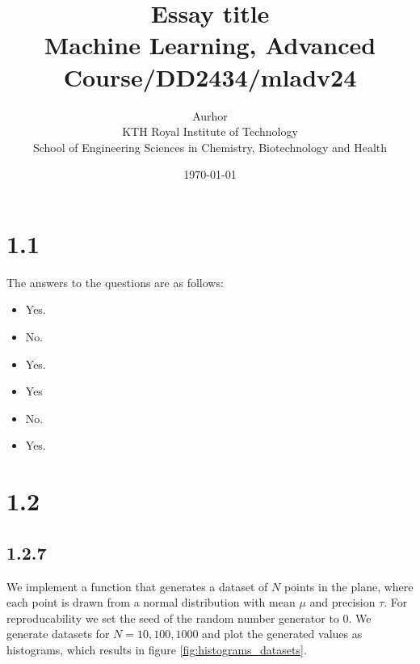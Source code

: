 \documentclass{article}
\title{Essay title\\\Large{Machine Learning, Advanced Course/DD2434/mladv24}}
\author{Aurhor \\ KTH Royal Institute of Technology\\ School of Engineering Sciences in Chemistry, Biotechnology and Health}
\date{\today}
\begin{document}
\maketitle

\fancyfoot[C]{\thepage}
\begin{multicols}{2}

    \section*{1.1}
    The answers to the questions are as follows:
    \begin{itemize}[noitemsep, topsep=0pt]
        \item Yes.
        \item No.
        \item Yes.
        \item Yes
        \item No.
        \item Yes.
    \end{itemize}
    \section*{1.2}

    \subsection*{1.2.7}
    We implement a function that generates a dataset of $N$ points in the plane, where each point is drawn from a normal distribution with mean $\mu$ and precision $\tau$. For reproducability we set the seed of the random number generator to 0. We generate datasets for $N = 10, 100, 1000$ and plot the generated values as histograms, which results in figure \autoref{fig:histograms_datasets}. 


\end{multicols}
\end{document}
